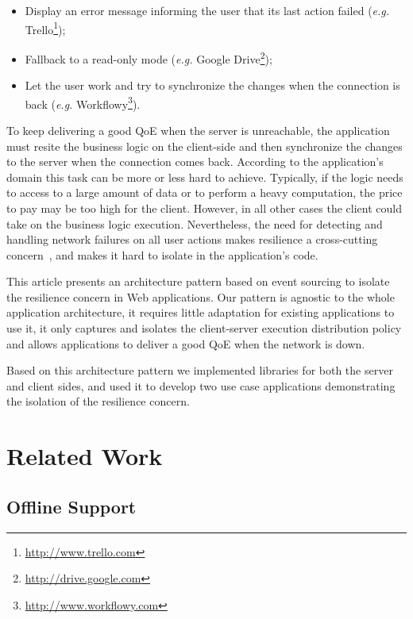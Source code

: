 \documentclass{llncs}
\begin{document}
\begin{itemize}
 \item Display an error message informing the user that its last action failed (\textit{e.g.} Trello\footnote{\href{http://www.trello.com}{http://www.trello.com}});
 \item Fallback to a read-only mode (\textit{e.g.} Google Drive\footnote{\href{http://drive.google.com}{http://drive.google.com}});
 \item Let the user work and try to synchronize the changes when the connection is back (\textit{e.g.} Workflowy\footnote{\href{http://www.workflowy.com}{http://www.workflowy.com}}).
\end{itemize}

To keep delivering a good QoE when the server is unreachable, the application must resite the business logic on the client-side and then synchronize the changes to the server when the connection comes back. According to the application's domain this task can be more or less hard to achieve. Typically, if the logic needs to access to a large amount of data or to perform a heavy computation, the price to pay may be too high for the client. However, in all other cases the client could take on the business logic execution. Nevertheless, the need for detecting and handling network failures on all user actions makes resilience a cross-cutting concern~\cite{Kiczales97_AOP}, and makes it hard to isolate in the application's code.

This article presents an architecture pattern based on event sourcing to isolate the resilience concern in Web applications. Our pattern is agnostic to the whole application architecture, it requires little adaptation for existing applications to use it, it only captures and isolates the client-server execution distribution policy and allows applications to deliver a good QoE when the network is down.

Based on this architecture pattern we implemented libraries for both the server and client sides, and used it to develop two use case applications demonstrating the isolation of the resilience concern.

\section{Related Work}

\cite{Zhang10_ElasticMobile}

\subsection{Offline Support}
\end{document}
